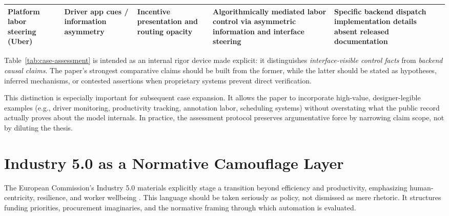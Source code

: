 \documentclass[runningheads]{llncs}
\begin{document}
\begin{table}
\begin{tabular}{|p{2.4cm}|p{2.8cm}|p{2.3cm}|p{3.1cm}|p{3.1cm}|}
\hline
Platform labor steering (Uber) & Driver app cues / information asymmetry & Incentive presentation and routing opacity & Algorithmically mediated labor control via asymmetric information and interface steering \cite{rosenblat2016uber} & Specific backend dispatch implementation details absent released documentation \\
\hline
\end{tabular}
\end{table}

Table~\ref{tab:case-assessment} is intended as an internal rigor device made explicit: it distinguishes \emph{interface-visible control facts} from \emph{backend causal claims}. The paper's strongest comparative claims should be built from the former, while the latter should be stated as hypotheses, inferred mechanisms, or contested assertions when proprietary systems prevent direct verification.

This distinction is especially important for subsequent case expansion. It allows the paper to incorporate high-value, designer-legible examples (e.g., driver monitoring, productivity tracking, annotation labor, scheduling systems) without overstating what the public record actually proves about the model internals. In practice, the assessment protocol preserves argumentative force by narrowing claim scope, not by diluting the thesis.

\section{Industry 5.0 as a Normative Camouflage Layer}

The European Commission's Industry 5.0 materials explicitly stage a transition beyond efficiency and productivity, emphasizing human-centricity, resilience, and worker wellbeing \cite{breque2021industry}. This language should be taken seriously as policy, not dismissed as mere rhetoric. It structures funding priorities, procurement imaginaries, and the normative framing through which automation is evaluated.
\end{document}
